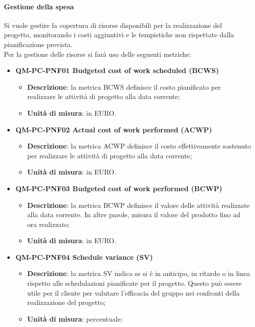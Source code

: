 			\paragraph{Gestione della spesa }
				Si vuole gestire la copertura di risorse disponibili per la realizzazione del progetto, monitorando i costi aggiuntivi e le tempistiche non rispettate dalla pianificazione prevista.\\
				Per la gestione delle risorse si farà uso delle seguenti metriche:
				\begin{itemize}
					\item\textbf{QM-PC-PNF01 Budgeted cost of work scheduled (BCWS)}
						\begin{itemize}
							\item\textbf{Descrizione}: la metrica BCWS definisce il costo pianificato per realizzare le attività di progetto alla data corrente;
							\item\textbf{Unità di misura}: in EURO.
						\end{itemize}
					\item\textbf{QM-PC-PNF02 Actual cost of work performed (ACWP)}
						\begin{itemize}
							\item\textbf{Descrizione}: la metrica ACWP definisce il costo effettivamente sostenuto per realizzare le attività di progetto alla data corrente;
							\item\textbf{Unità di misura}: in EURO.
						\end{itemize}
					\item\textbf{QM-PC-PNF03 Budgeted cost of work performed (BCWP)}
						\begin{itemize}
							\item\textbf{Descrizione}: la metrica BCWP definisce il valore delle attività realizzate alla data corrente. In altre parole, misura il valore del prodotto fino ad ora realizzato;
							\item\textbf{Unità di misura}: in EURO.
						\end{itemize}
					\item\textbf{QM-PC-PNF04 Schedule variance (SV)}
						\begin{itemize}
							\item\textbf{Descrizione}: la metrica SV indica se si è in anticipo, in ritardo o in linea rispetto alle schedulazioni pianificate per il progetto. Questo può essere utile per il cliente per valutare l'efficacia del gruppo nei confronti della realizzazione del progetto;
							\item\textbf{Unità di misura}: percentuale;

\end{itemize}
\end{itemize}

